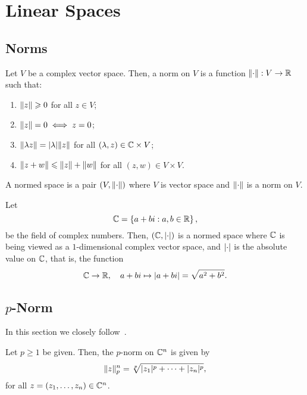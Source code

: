 \section{Linear Spaces}\label{sec:linear-spaces}

\subsection{Norms}\label{subsec:norms}

\begin{definition}\label{def:normed-linear-spaces}
  Let \(V\) be a complex vector space. Then, a norm on \(V\) is a function
  \(\norm:V\to\reals\) such that:
  \begin{enumerate}
    \item
      \(\norm(z)\geqslant{0}\) for all \(z\in{V}\);
    \item
      \(\norm(z)=0\iff{z=0}\);
    \item
      \(\norm(\lambda{z})=\abs{\lambda}\norm(z)\) for all
      \((\lambda,z)\in\mathbb{C}\times{V}\);
    \item
      \(\norm(z+w)\leqslant{\norm(z)+\norm(w)}\) for all
      \((z,w)\in{V\times{V}}\).
  \end{enumerate}
  A normed space is a pair \((V,\norm)\) where \(V\) is vector space and
  \(\norm\) is a norm on \(V\).
\end{definition}

\begin{example}\label{the-complex-field-is-a-normed-linear-space}
  Let
  \[
    \mathbb{C}=\left\{a+bi:a,b\in\mathbb{R}\right\},
  \]
  be the field of complex numbers. Then, \((\mathbb{C},\lvert\cdot\rvert)\) is a
  normed space where \(\mathbb{C}\) is being viewed as a \(1\)-dimensional
  complex vector space, and \(\lvert\cdot\rvert\) is the absolute value on
  \(\mathbb{C}\), that is, the function
  \[
    \mathbb{C}\to\mathbb{R},
    \quad{a+bi\mapsto\lvert a+bi\rvert=\sqrt{{a}^{2}+{b}^{2}}}.
  \]
\end{example}


\subsection{\(p\)-Norm}\label{subsec:p-norm}

In this section we closely
follow~\cite{yet_another_proof_of_minkowskis_inequality}.

\begin{definition}
  Let \(p\geqslant{1}\) be given. Then, the \(p\)-norm on \(\mathbb{C}^{n}\)
  is given by
  \[
    \norm<n>[p](z)
    =
    \sqrt[p]{\abs{z_{1}}^{p}+\cdots+\abs{z_{n}}^{p}},
  \]
  for all \(z=(z_{1},\ldots,z_{n})\in\mathbb{C}^{n}\).
\end{definition}

